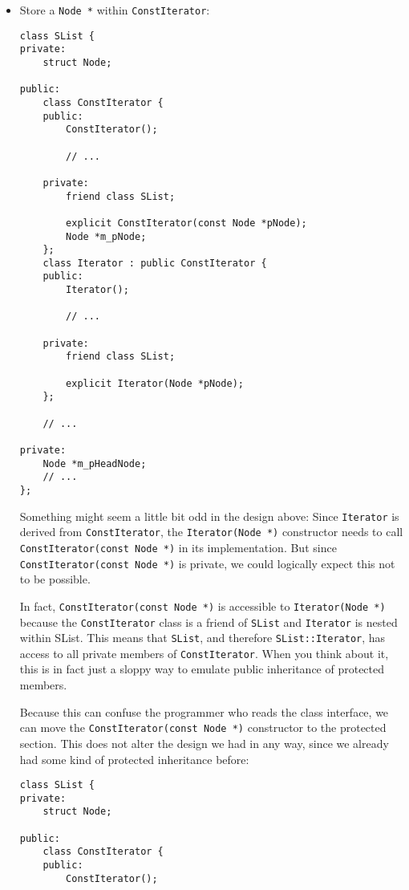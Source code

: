 \begin{itemize}
\item Store a \lstinline!Node *! within \lstinline!ConstIterator!:
\begin{lstlisting}[frame=single, caption={SList.h}]
class SList {
private:
    struct Node;

public:
    class ConstIterator {
    public:
        ConstIterator();
                
        // ...
        
    private:
        friend class SList;
    
        explicit ConstIterator(const Node *pNode);
        Node *m_pNode;
    };
    class Iterator : public ConstIterator {
    public:
        Iterator();
        
        // ...
        
    private:
        friend class SList;
    
        explicit Iterator(Node *pNode);
    };
    
    // ...

private:
    Node *m_pHeadNode;
    // ...
};
\end{lstlisting}
Something might seem a little bit odd in the design above: Since \lstinline!Iterator! is derived from \lstinline!ConstIterator!, the \lstinline!Iterator(Node *)! constructor needs to call \lstinline!ConstIterator(const Node *)! in its implementation. But since \lstinline!ConstIterator(const Node *)! is private, we could logically expect this not to be possible.

In fact, \lstinline!ConstIterator(const Node *)! is accessible to \lstinline!Iterator(Node *)! because the \lstinline!ConstIterator! class is a friend of \lstinline!SList! and \lstinline!Iterator! is nested within SList. This means that \lstinline!SList!, and therefore \lstinline!SList::Iterator!, has access to all private members of \lstinline!ConstIterator!. When you think about it, this is in fact just a sloppy way to emulate public inheritance of protected members.

Because this can confuse the programmer who reads the class interface, we can move the \lstinline!ConstIterator(const Node *)! constructor to the protected section. This does not alter the design we had in any way, since we already had some kind of protected inheritance before:
\begin{lstlisting}[frame=single, caption={SList.h}]
class SList {
private:
    struct Node;

public:
    class ConstIterator {
    public:
        ConstIterator();
                

\end{lstlisting}
\end{itemize}
